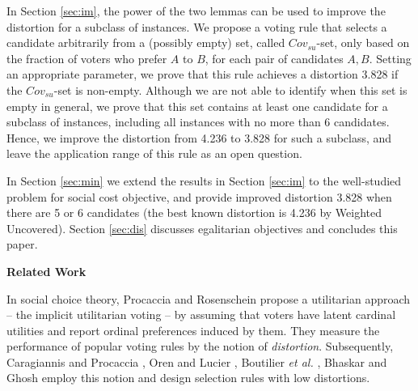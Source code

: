 \documentclass[11pt]{article}
\theoremstyle{remark}
\begin{document}
In Section \ref{sec:im}, the power of the two lemmas can be used to improve the distortion for a subclass of instances. We propose a voting rule that selects a candidate arbitrarily from a (possibly empty) set, called $Cov_{su}$-set, only based on the fraction of voters who prefer $A$ to $B$, for each pair of candidates $A,B$. Setting an appropriate parameter, we prove that this rule achieves a distortion 3.828 if the $Cov_{su}$-set is non-empty. Although we are not able to identify when this set is empty in general, we prove that this set contains at least one candidate for a subclass of instances, including all instances with no more than 6 candidates. Hence, we improve the distortion from 4.236 to 3.828 for such a subclass, and leave the application range of this rule as an open question.


In Section \ref{sec:min} we extend the results in Section \ref{sec:im} to the well-studied problem for social cost objective, and provide improved distortion 3.828 when there are 5 or 6 candidates (the best known distortion is 4.236 by Weighted Uncovered).  Section \ref{sec:dis} discusses egalitarian objectives and concludes this paper.



\medskip\noindent\textbf{Related Work}

In social choice theory, Procaccia and Rosenschein \cite{procaccia2006distortion} propose a utilitarian approach -- the implicit utilitarian voting -- by assuming that voters have latent cardinal utilities and report ordinal preferences induced by them. They measure the performance of popular voting rules by the notion of \emph{distortion}. Subsequently, Caragiannis and Procaccia \cite{caragiannis2011voting}, Oren and Lucier \cite{oren2014online}, Boutilier \emph{et al.} \cite{boutilier2015optimal}, Bhaskar and
Ghosh \cite{bhaskar} employ this notion and design selection rules with low distortions.
\end{document}
